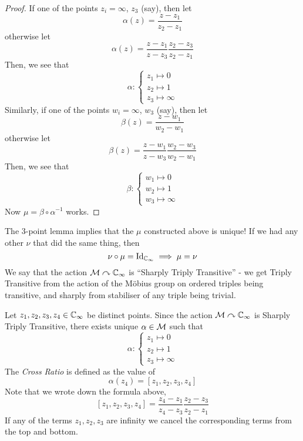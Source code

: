 \documentclass{article}
\begin{document}
\begin{proof}
    If one of the points $z_i = \infty$, $z_3$ (say), then let
    \[
        \alpha(z) = \frac{z - z_1}{z_2 - z_1}
    \]
    otherwise let 
    \[
        \alpha(z) = \frac{z - z_1}{z - z_3} \frac{z_2 - z_3}{z_2 - z_1}
    \]
    Then, we see that
    \[
        \alpha: \begin{cases}
            z_1 \mapsto 0 \\
            z_2 \mapsto 1 \\
            z_3 \mapsto \infty
        \end{cases}
    \]
    Similarly, if one of the points $w_i = \infty$, $w_3$ (say), then let
    \[
        \beta(z) = \frac{z - w_1}{w_2 - w_1}
    \] 
    otherwise let
    \[
        \beta(z) = \frac{z - w_1}{z - w_3} \frac{w_2 - w_3}{w_2 - w_1}
    \]
    Then, we see that
    \[
        \beta: \begin{cases}
            w_1 \mapsto 0 \\
            w_2 \mapsto 1 \\
            w_3 \mapsto \infty
        \end{cases}
    \]
    Now $\mu = \beta \circ \alpha^{-1}$ works.
\end{proof}

\begin{remark}
    The 3-point lemma implies that the $\mu$ constructed above is unique! If we had any other $\nu$ that did the same thing, then
    \[
        \nu \circ \mu = \mathrm{Id}_{\mathbb{C}_\infty} \implies \mu = \nu
    \]
    We say that the action $\mathcal{M} \curvearrowright \mathbb{C}_\infty$ is ``Sharply Triply Transitive'' - we get Triply Transitive from the action of the M\"obius group on ordered triples being transitive, and sharply from stabiliser of any triple being trivial.
\end{remark}

\begin{defi}
    Let $z_1, z_2, z_3, z_4 \in \mathbb{C}_\infty$ be distinct points. Since the action $\mathcal{M} \curvearrowright \mathbb{C}_\infty$ is Sharply Triply Transitive, there exists unique $\alpha \in \mathcal{M}$ such that
    \[
        \alpha: \begin{cases}
            z_1 \mapsto 0 \\
            z_2 \mapsto 1 \\
            z_3 \mapsto \infty
        \end{cases}
    \]
    The \emph{Cross Ratio} is defined as the value of
    \[
        \alpha(z_4) = [z_1, z_2, z_3, z_4]
    \]
    Note that we wrote down the formula above,
    \[
        [z_1, z_2, z_3, z_4] = \frac{z_4 - z_1}{z_4 - z_3} \frac{z_2 - z_3}{z_2 - z_1}
    \]
    If any of the terms $z_1, z_2, z_3$ are infinity we cancel the corresponding terms from the top and bottom.
\end{defi}
\end{document}
